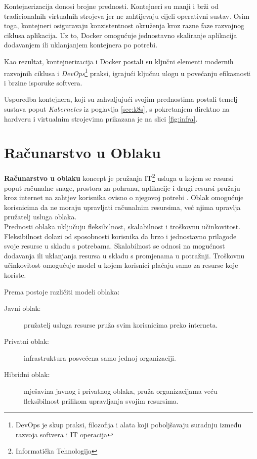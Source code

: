 \documentclass[times, utf8, diplomski]{fer}
\begin{document}
Kontejnerizacija donosi brojne prednosti. Kontejneri su manji i brži od tradicionalnih virtualnih strojeva jer ne zahtijevaju cijeli operativni sustav. Osim toga, kontejneri osiguravaju konzistentnost okruženja kroz razne faze razvojnog ciklusa aplikacija. Uz to, Docker omogućuje jednostavno skaliranje aplikacija dodavanjem ili uklanjanjem kontejnera po potrebi.

Kao rezultat, kontejnerizacija i Docker postali su ključni elementi modernih razvojnih ciklusa i \emph{DevOps}\footnote{DevOps je skup praksi, filozofija i alata koji poboljšavaju suradnju između razvoja softvera  i IT operacija } praksi, igrajući ključnu ulogu u povećanju efikasnosti i brzine isporuke softvera. 

Usporedba kontejnera, koji su zahvaljujući svojim prednostima postali temelj sustava poput \emph{Kubernetes} iz poglavlja \ref{sec:k8s}, s pokretanjem direktno na hardveru i virtualnim strojevima prikazana je na slici \ref{fig:infra}.

\section{Računarstvo u Oblaku}

\textbf{Računarstvo u oblaku}  koncept je pružanja IT\footnote{Informatička Tehnologija } usluga u kojem se resursi poput računalne snage, prostora za pohranu, aplikacije i drugi resursi pružaju kroz internet na zahtjev korisnika ovisno o njegovoj potrebi \citep{zarko_raspodijeljeni_2013}. Oblak omogućuje korisnicima da ne moraju upravljati računalnim resursima, već njima upravlja pružatelj usluga oblaka. \\

Prednosti oblaka uključuju fleksibilnost, skalabilnost i troškovnu učinkovitost. Fleksibilnost dolazi od sposobnosti korisnika da brzo i jednostavno prilagode svoje resurse u skladu s potrebama. Skalabilnost se odnosi na mogućnost dodavanja ili uklanjanja resursa u skladu s promjenama u potražnji. Troškovnu učinkovitost omogućuje model u kojem korisnici plaćaju samo za resurse koje koriste.

Prema \citet{zarko_raspodijeljeni_2013} postoje različiti modeli oblaka:
\begin{description}
	\item [Javni oblak:] pružatelj usluga resurse pruža svim korisnicima preko interneta.
	\item [Privatni oblak:] infrastruktura posvećena samo jednoj organizaciji.
	\item [Hibridni oblak:] mješavina javnog i privatnog oblaka, pruža organizacijama veću fleksibilnost prilikom upravljanja svojim resursima.
\end{description}
\end{document}
